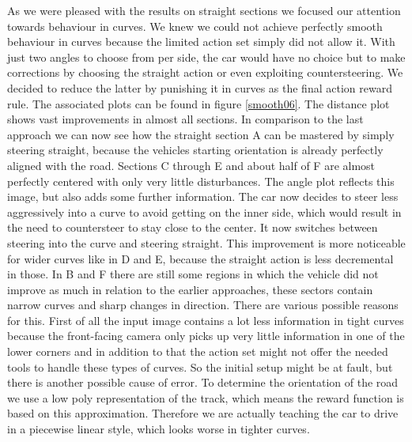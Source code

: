 As we were pleased with the results on straight sections we focused our attention towards behaviour in curves. We knew we could not achieve perfectly smooth behaviour in curves because the limited action set simply did not allow it. With just two angles to choose from per side, the car would have no choice but to make corrections by choosing the straight action or even exploiting countersteering. We decided to reduce the latter by punishing it in curves as the final action reward rule. The associated plots can be found in figure \ref{smooth06}. The distance plot shows vast improvements in almost all sections. In comparison to the last approach we can now see how the straight section A can be mastered by simply steering straight, because the vehicles starting orientation is already perfectly aligned with the road. Sections C through E and about half of F are almost perfectly centered with only very little disturbances. The angle plot reflects this image, but also adds some further information. The car now decides to steer less aggressively into a curve to avoid getting on the inner side, which would result in the need to countersteer to stay close to the center. It now switches between steering into the curve and steering straight. This improvement is more noticeable for wider curves like in D and E, because the straight action is less decremental in those. In B and F there are still some regions in which the vehicle did not improve as much in relation to the earlier approaches, these sectors contain narrow curves and sharp changes in direction. There are various possible reasons for this. First of all the input image contains a lot less information in tight curves because the front-facing camera only picks up very little information in one of the lower corners and in addition to that the action set might not offer the needed tools to handle these types of curves. So the initial setup might be at fault, but there is another possible cause of error. To determine the orientation of the road we use a low poly representation of the track, which means the reward function is based on this approximation. Therefore we  are actually teaching the car to drive in a piecewise linear style, which looks worse in tighter curves.


